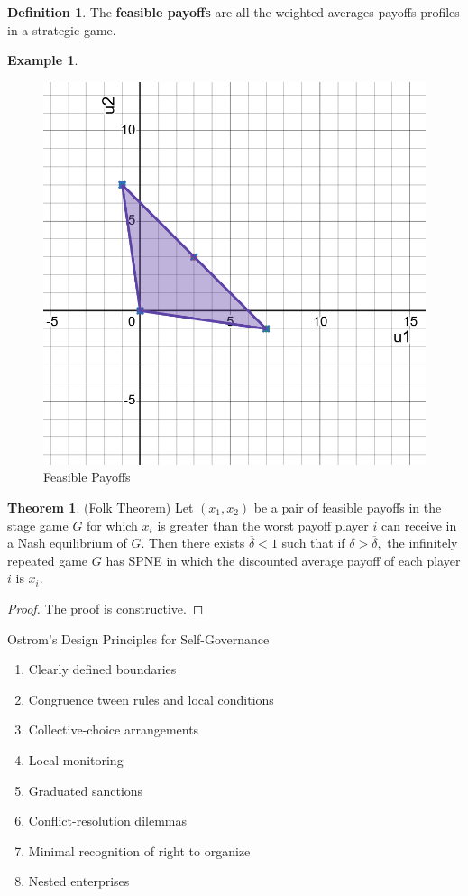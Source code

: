 \documentclass[10pt, oneside]{article}
\theoremstyle{definition}
\newtheorem{exmp}{Example}[section]
\newtheorem{thm}{Theorem}
\newtheorem{defn}{Definition}
\begin{document}
\begin{defn}
    The \textbf{feasible payoffs} are all the weighted averages payoffs profiles in a strategic game.
\end{defn}
\begin{exmp}
    
\begin{figure}[H]
    \centering
    \includegraphics[width=0.5\linewidth]{SSI 1/Exmp.png}
    \caption{Feasible Payoffs}
\end{figure}
\end{exmp}

\begin{thm}
    (Folk Theorem) Let $(x_1, x_2)$ be a pair of feasible payoffs in the stage game $G$ for which $x_i$ is greater than the worst payoff player $i$ can receive in a Nash equilibrium of $G$. Then there exists $\overline{\delta} < 1$ such that if $\delta>\overline{\delta},$ the infinitely repeated game $G$ has SPNE in which the discounted average payoff of each player $i$ is $x_i.$
\end{thm}
\begin{proof}
    The proof is constructive.
\end{proof}

Ostrom's Design Principles for Self-Governance
\begin{enumerate}
    \item Clearly defined boundaries
    \item Congruence tween rules and local conditions
    \item Collective-choice arrangements
    \item Local monitoring
    \item Graduated sanctions
    \item Conflict-resolution dilemmas
    \item Minimal recognition of right to organize
    \item Nested enterprises
\end{enumerate}
\end{document}
